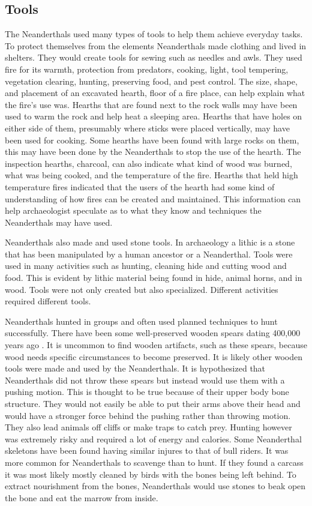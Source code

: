 \subsection{Tools}
The Neanderthals used many types of tools to help them achieve everyday tasks. To protect themselves from the elements Neanderthals made clothing and lived in shelters. They would create tools for sewing such as needles and awls. They used fire for its warmth, protection from predators, cooking, light, tool tempering, vegetation clearing, hunting, preserving food, and pest control. The size, shape, and placement of an excavated hearth, floor of a fire place, can help explain what the fire's use was. Hearths that are found next to the rock walls may have been used to warm the rock and help heat a sleeping area. Hearths that have holes on either side of them, presumably where sticks were placed vertically, may have been used for cooking. Some hearths have been found with large rocks on them, this may have been done by the Neanderthals to stop the use of the hearth. The inspection hearths, charcoal, can also indicate what kind of wood was burned, what was being cooked, and the temperature of the fire. Hearths that held high temperature fires indicated that the users of the hearth had some kind of understanding of how fires can be created and maintained. This information can help archaeologist speculate as to what they know and techniques the Neanderthals may have used.  


Neanderthals also made and used stone tools. In archaeology a lithic is a stone that has been manipulated by a  human ancestor or a Neanderthal. Tools were used in many activities such as hunting, cleaning hide and cutting wood and food. This is evident by lithic material being found in hide, animal horns, and in wood. Tools were not only created but also specialized. Different activities required different tools. 


Neanderthals hunted in groups and often used planned techniques to hunt successfully. There have been some well-preserved wooden spears dating 400,000 years ago \cite{Harvati2010}. It is uncommon to find wooden artifacts, such as these spears, because wood needs specific circumstances to become preserved. It is likely other wooden tools were made and used by the Neanderthals. It is hypothesized that Neanderthals did not throw these spears but instead would use them with a pushing motion. This is thought to be true because of their upper body bone structure. They would not easily be able to put their arms above their head and would have a stronger force behind the pushing rather than throwing motion. They also lead animals off cliffs or make traps to catch prey. Hunting however was extremely risky and required a lot of energy and calories. Some Neanderthal skeletons have been found having similar injures to that of bull riders. It was more common for Neanderthals to scavenge than to hunt. If they found a carcass it was most likely mostly cleaned by birds with the bones being left behind. To extract nourishment from the bones, Neanderthals would use stones to beak open the bone and eat the marrow from inside.


